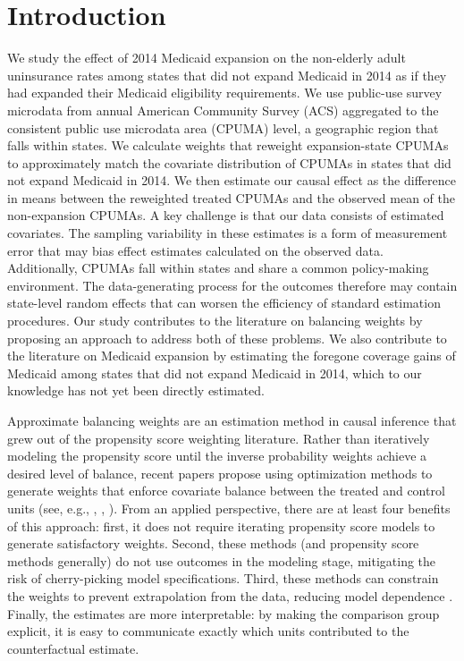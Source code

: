 \documentclass[aoas]{imsart}
\theoremstyle{plain}
\theoremstyle{remark}
\begin{document}

\section{Introduction}

We study the effect of 2014 Medicaid expansion on the non-elderly adult uninsurance rates among states that did not expand Medicaid in 2014 as if they had expanded their Medicaid eligibility requirements. We use public-use survey microdata from annual American Community Survey (ACS) aggregated to the consistent public use microdata area (CPUMA) level, a geographic region that falls within states. We calculate weights that reweight expansion-state CPUMAs to approximately match the covariate distribution of CPUMAs in states that did not expand Medicaid in 2014. We then estimate our causal effect as the difference in means between the reweighted treated CPUMAs and the observed mean of the non-expansion CPUMAs. A key challenge is that our data consists of estimated covariates. The sampling variability in these estimates is a form of measurement error that may bias effect estimates calculated on the observed data. Additionally, CPUMAs fall within states and share a common policy-making environment. The data-generating process for the outcomes therefore may contain state-level random effects that can worsen the efficiency of standard estimation procedures. Our study contributes to the literature on balancing weights by proposing an approach to address both of these problems. We also contribute to the literature on Medicaid expansion by estimating the foregone coverage gains of Medicaid among states that did not expand Medicaid in 2014, which to our knowledge has not yet been directly estimated.

Approximate balancing weights are an estimation method in causal inference that grew out of the propensity score weighting literature. Rather than iteratively modeling the propensity score until the inverse probability weights achieve a desired level of balance, recent papers propose using optimization methods to generate weights that enforce covariate balance between the treated and control units (see, e.g., \cite{hainmueller2012entropy}, \cite{imai2014covariate}, \cite{zubizarreta2015stable}). From an applied perspective, there are at least four benefits of this approach: first, it does not require iterating propensity score models to generate satisfactory weights. Second, these methods (and propensity score methods generally) do not use outcomes in the modeling stage, mitigating the risk of cherry-picking model specifications. Third, these methods can constrain the weights to prevent extrapolation from the data, reducing model dependence \cite{zubizarreta2015stable}. Finally, the estimates are more interpretable: by making the comparison group explicit, it is easy to communicate exactly which units contributed to the counterfactual estimate.
\end{document}
